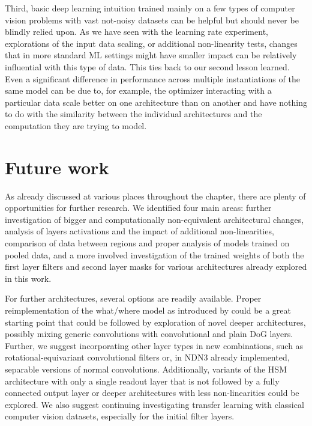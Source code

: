 Third, basic deep learning intuition trained mainly on a few types of computer vision problems with vast not-noisy datasets can be helpful but should never be blindly relied upon. As we have seen with the learning rate experiment, explorations of the input data scaling, or additional non-linearity tests, changes that in more standard ML settings might have smaller impact can be relatively influential with this type of data. This ties back to our second lesson learned. Even a significant difference in performance across multiple instantiations of the same model can be due to, for example, the optimizer interacting with a particular data scale better on one architecture than on another and have nothing to do with the similarity between the individual architectures and the computation they are trying to model.

\section*{Future work}

As already discussed at various places throughout the  chapter, there are plenty of opportunities for further research. We identified four main areas: further investigation of bigger and computationally non-equivalent architectural changes, analysis of layers activations and the impact of additional non-linearities, comparison of data between regions and proper analysis of models trained on pooled data, and a more involved investigation of the trained weights of both the first layer filters and second layer masks for various architectures already explored in this work.

For further architectures, several options are readily available. Proper reimplementation of the what/where model as introduced by \citeauthor{klindt} could be a great starting point that could be followed by exploration of novel deeper architectures, possibly mixing generic convolutions with convolutional and plain DoG layers. Further, we suggest incorporating other layer types in new combinations, such as rotational-equivariant convolutional filters \citep{ecker} or, in NDN3 already implemented, separable versions of normal convolutions. Additionally, variants of the {HSM architecture} with only a single readout layer that is not followed by a fully connected output layer or deeper architectures with less non-linearities could be explored. We also suggest continuing investigating transfer learning with classical computer vision datasets, especially for the initial filter layers. 

